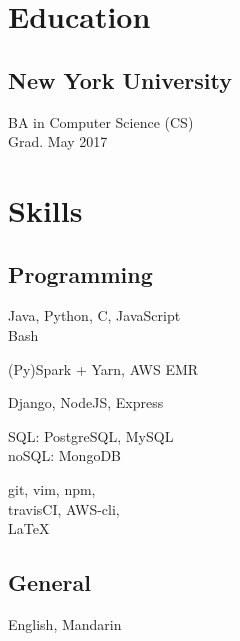 \documentclass[]{two-column-resume}
\begin{document}
\begin{minipage}[t]{0.34\textwidth}

\section{Education} 

\subsection{New York University}
BA in Computer Science (CS) \\
Grad. May 2017 \\
\sectionsep


\section{Skills}
\subsection{Programming}
Java, Python, C, JavaScript\\
Bash
\newline

(Py)Spark + Yarn, AWS EMR
\newline

Django, NodeJS, Express
\newline

SQL: PostgreSQL, MySQL\\
noSQL: MongoDB
\newline

git, vim, npm,\\
travisCI, AWS-cli, \\
\LaTeX

\sectionsep

\subsection{General}
English, Mandarin
\newline


\end{minipage}
\end{document}
